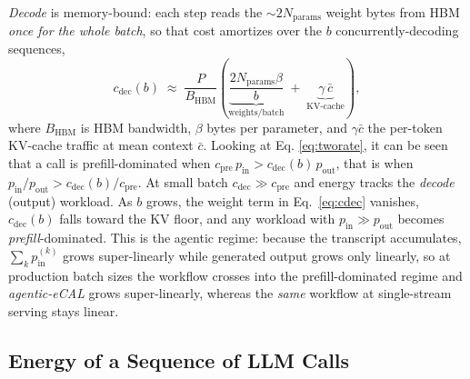 \documentclass[journal]{IEEEtran}
\newcommand{\agecal}{\textit{agentic-eCAL}}
\begin{document}
\textit{Decode} is memory-bound: each
step reads the $\sim\!2N_{\mathrm{params}}$ weight bytes from HBM \emph{once for the whole batch}, so that cost
amortizes over the $b$ concurrently-decoding sequences,
\begin{equation}
c_{\mathrm{dec}}(b)\;\approx\;\frac{P}{B_{\mathrm{HBM}}}\!\left(\underbrace{\frac{2N_{\mathrm{params}}\beta}{b}}_{\text{weights}/\text{batch}}
   \;+\;\underbrace{\gamma\,\bar c}_{\text{KV-cache}}\right),
\label{eq:cdec}
\end{equation}
where $B_{\mathrm{HBM}}$ is HBM bandwidth, $\beta$ bytes per parameter, and $\gamma\bar c$ the
per-token KV-cache traffic at mean context $\bar c$.
Looking at Eq. \ref{eq:tworate}, it can be seen that a call is prefill-dominated when
$c_{\mathrm{pre}}\,p_{\mathrm{in}}>c_{\mathrm{dec}}(b)\,p_{\mathrm{out}}$, that is when
$p_{\mathrm{in}}/p_{\mathrm{out}}>c_{\mathrm{dec}}(b)/c_{\mathrm{pre}}$. At small batch
$c_{\mathrm{dec}}\!\gg\!c_{\mathrm{pre}}$ and energy tracks the \emph{decode} (output) workload. As
$b$ grows, the weight term in Eq.~\eqref{eq:cdec} vanishes, $c_{\mathrm{dec}}(b)$ falls toward the
KV floor, and any workload with $p_{\mathrm{in}}\!\gg\!p_{\mathrm{out}}$ becomes
\emph{prefill}-dominated. This is the agentic regime: because the transcript accumulates, $\sum_k p_{\mathrm{in}}^{(k)}$ grows super-linearly while generated
output grows only linearly, so at production batch sizes the workflow crosses into the
prefill-dominated regime and \agecal{} grows super-linearly, whereas the \emph{same} workflow at
single-stream serving stays linear. 

\subsection{Energy of a Sequence of  LLM Calls}\label{sec:callseq}
\end{document}
